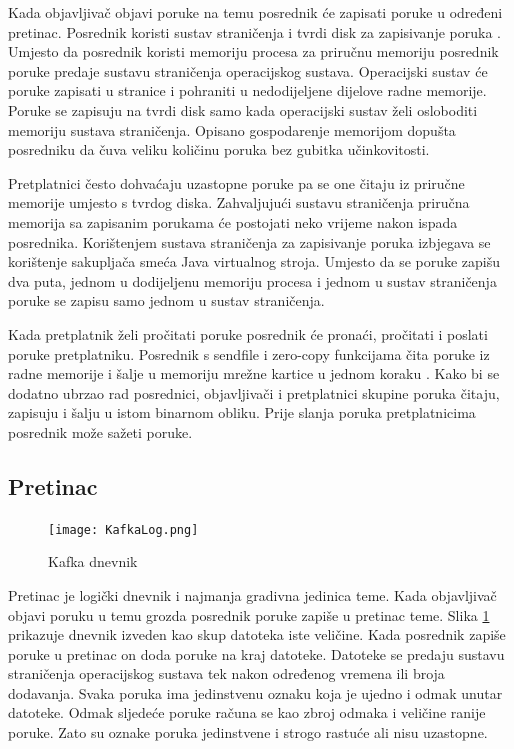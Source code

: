 \documentclass[utf8, diplomski, lmodern, numeric]{fer}
\begin{document}
Kada objavljivač objavi poruke na temu posrednik će zapisati poruke u određeni pretinac. Posrednik koristi sustav straničenja  i tvrdi disk za zapisivanje poruka \citep{kafka-paging}. Umjesto da posrednik koristi memoriju procesa za priručnu memoriju posrednik poruke predaje sustavu straničenja operacijskog sustava. Operacijski sustav će poruke zapisati u stranice i pohraniti u nedodijeljene dijelove radne memorije. Poruke se zapisuju na tvrdi disk samo kada operacijski sustav želi osloboditi memoriju sustava straničenja. Opisano gospodarenje memorijom dopušta posredniku da čuva veliku količinu poruka bez gubitka učinkovitosti.

Pretplatnici često dohvaćaju uzastopne poruke pa se one čitaju iz priručne memorije umjesto s tvrdog diska. Zahvaljujući sustavu straničenja priručna memorija sa zapisanim porukama će postojati neko vrijeme nakon ispada posrednika. Korištenjem sustava straničenja za zapisivanje poruka izbjegava se korištenje sakupljača smeća Java virtualnog stroja. Umjesto da se poruke zapišu dva puta, jednom u dodijeljenu memoriju procesa i jednom u sustav straničenja poruke se zapisu samo jednom u sustav straničenja.

Kada pretplatnik želi pročitati poruke posrednik će pronaći, pročitati i poslati poruke pretplatniku. Posrednik s sendfile i zero-copy funkcijama čita poruke iz radne memorije i šalje u memoriju mrežne kartice u jednom koraku \citep{linux-sendfile} \citep{java-zero-copy}. Kako bi se dodatno ubrzao rad posrednici, objavljivači i pretplatnici skupine poruka čitaju, zapisuju i šalju u istom binarnom obliku. Prije slanja poruka pretplatnicima posrednik može sažeti poruke.

\subsection{Pretinac}

\begin{figure}[H]
    \centering
    \texttt{[image: KafkaLog.png]}
    \caption{Kafka dnevnik}
    \label{fig:kafka-log}
\end{figure}

Pretinac  je logički dnevnik  i najmanja gradivna jedinica teme. Kada objavljivač objavi poruku u temu grozda posrednik poruke zapiše u pretinac teme. Slika \ref{fig:kafka-log} prikazuje dnevnik izveden kao skup datoteka iste veličine. Kada posrednik zapiše poruke u pretinac on doda poruke na kraj datoteke. Datoteke se predaju sustavu straničenja operacijskog sustava tek nakon određenog vremena ili broja dodavanja. Svaka poruka ima jedinstvenu oznaku koja je ujedno i odmak unutar datoteke. Odmak sljedeće poruke računa se kao zbroj odmaka i veličine ranije poruke. Zato su oznake poruka jedinstvene i strogo rastuće ali nisu uzastopne.
\end{document}
